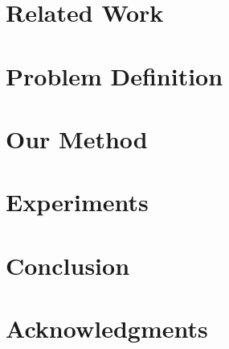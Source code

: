 \documentclass[letterpaper]{article} %
\begin{document}
\section{Related Work}
\label{sec:related}


\section{Problem Definition}
\label{sec:definition}


\section{Our Method}
\label{sec:method}


\section{Experiments}
\label{sec:experiment}


\section{Conclusion}
\label{sec:conclusion}


\section{Acknowledgments}
\label{sec:acknoledgments}




\end{document}
